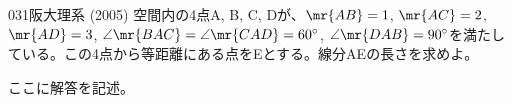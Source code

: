 \begin{prob}{031}{}{阪大理系 (2005)}
 空間内の4点A, B, C, Dが、$\mr{AB}=1$, $\mr{AC}=2$, $\mr{AD}=3$, $\angle\mr{BAC}=\angle\mr{CAD}=60^\circ$, $\angle\mr{DAB}=90^\circ$を満たしている。この4点から等距離にある点をEとする。線分AEの長さを求めよ。
\end{prob}
ここに解答を記述。